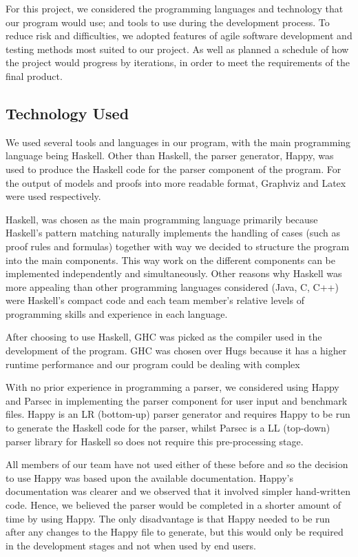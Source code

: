 For this project, we considered the programming languages and technology that our program would use; and tools to use during the development process. To reduce risk and difficulties, we adopted features of agile software development and testing methods most suited to our project. As well as planned a schedule of how the project would progress by iterations, in order to meet the requirements of the final product.

\subsection{Technology Used}
\label{sec:techused}

We used several tools and languages in our program, with the main programming language being Haskell. Other than Haskell, the parser generator, Happy, was used to produce the Haskell code for the parser component of the program. For the output of models and proofs into more readable format, Graphviz and Latex were used respectively.

Haskell, was chosen as the main programming language primarily because Haskell's pattern matching naturally implements the handling of cases (such as proof rules and formulas) together with way we decided to structure the program into the main components. This way work on the different components can be implemented independently and simultaneously. Other reasons why Haskell was more appealing than other programming languages considered (Java, C, C++) were Haskell's compact code and each team member's relative levels of programming skills and experience in each language.

After choosing to use Haskell, GHC was picked as the compiler used in the development of the program. GHC was chosen over Hugs because it has a higher runtime performance and our program could be dealing with complex 

With no prior experience in programming a parser, we considered using Happy and Parsec in implementing the parser component for user input and benchmark files. Happy is an LR (bottom-up) parser generator and requires Happy to be run to generate the Haskell code for the parser, whilst Parsec is a LL (top-down) parser library for Haskell so does not require this pre-processing stage.

All members of our team have not used either of these before and so the decision to use Happy was based upon the available documentation. Happy's documentation was clearer and we observed that it involved simpler hand-written code. Hence, we believed the parser would be completed in a shorter amount of time by using Happy. The only disadvantage is that Happy needed to be run after any changes to the Happy file to generate, but this would only be required in the development stages and not when used by end users.

